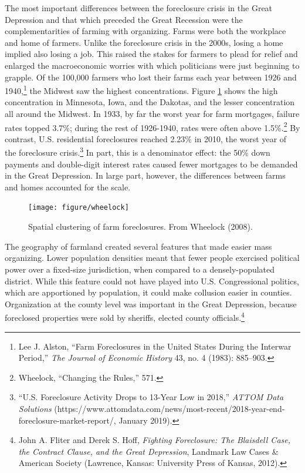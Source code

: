 \documentclass[12pt,oneside]{psthesis}
\begin{document}
The most important differences between the foreclosure crisis in the Great Depression and that which preceded the Great Recession were the complementarities of farming with organizing.
Farms were both the workplace and home of farmers.
Unlike the foreclosure crisis in the 2000s, losing a home implied also losing a job.
This raised the stakes for farmers to plead for relief and enlarged the macroeconomic worries with which politicians were just beginning to grapple.
Of the 100,000 farmers who lost their farms each year between 1926 and 1940,\footnote{Lee J. Alston, ``Farm Foreclosures in the United States During the Interwar Period,'' \emph{The Journal of Economic History} 43, no. 4 (1983): 885--903.} the Midwest saw the highest concentrations.
Figure \ref{fig:wheelock-farms} shows the high concentration in Minnesota, Iowa, and the Dakotas, and the lesser concentration all around the Midwest.
In 1933, by far the worst year for farm mortgages, failure rates topped 3.7\%; during the rest of 1926-1940, rates were often above 1.5\%.\footnote{Wheelock, ``Changing the Rules,'' 571.}
By contrast, U.S. residential foreclosures reached 2.23\% in 2010, the worst year of the foreclosure crisis.\footnote{``U.S. Foreclosure Activity Drops to 13-Year Low in 2018,'' \emph{ATTOM Data Solutions} (https://www.attomdata.com/news/most-recent/2018-year-end-foreclosure-market-report/, January 2019).}
In part, this is a denominator effect: the 50\% down payments and double-digit interest rates caused fewer mortgages to be demanded in the Great Depression.
In large part, however, the differences between farms and homes accounted for the scale.
\begin{figure}

{\centering \texttt{[image: figure/wheelock]} 

}

\caption{Spatial clustering of farm foreclosures. From Wheelock (2008).}\label{fig:wheelock-farms}
\end{figure}
The geography of farmland created several features that made easier mass organizing.
Lower population densities meant that fewer people exercised political power over a fixed-size jurisdiction, when compared to a densely-populated district.
While this feature could not have played into U.S. Congressional politics, which are apportioned by population, it could make collusion easier in counties.
Organization at the county level was important in the Great Depression, because foreclosed properties were sold by sheriffs, elected county officials.\footnote{John A. Fliter and Derek S. Hoff, \emph{Fighting Foreclosure: The Blaisdell Case, the Contract Clause, and the Great Depression}, Landmark Law Cases \& American Society (Lawrence, Kansas: University Press of Kansas, 2012).}
\end{document}
